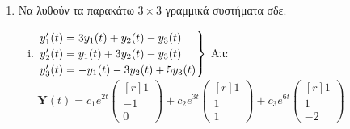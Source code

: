 \begin{enumerate}
  \item Να λυθούν τα παρακάτω $ 3 \times 3$  γραμμικά συστήματα σδε.

    \begin{enumerate}[i)]


      \item $ \left.
          \renewcommand{\arraystretch}{1.2}
          \begin{matrix*}[l]
            y_{1}'(t) = 3 y_{1}(t) + y_{2}(t) - y_{3}(t) \\
            y_{2}'(t) = y_{1}(t) + 3y_{2}(t) - y_{3}(t) \\
            y_{3}'(t) = -y_{1}(t) - 3y_{2}(t) + 5y_{3}(t)
          \end{matrix*}
        \right\}$ 
        \hfill Απ: {\scriptsize $ \mathbf{Y}(t) = c_{1}e^{2t} 
          \begin{pmatrix*}[r] 1 \\ -1 \\ 0 \end{pmatrix*} + c_{2}e^{3t} 
          \begin{pmatrix*}[r] 1 \\ 1 \\ 1 \end{pmatrix*} + c_{3} e^{6t}
        \begin{pmatrix*}[r] 1 \\ 1 \\ -2 \end{pmatrix*}$ }


\end{enumerate}
\end{enumerate}
